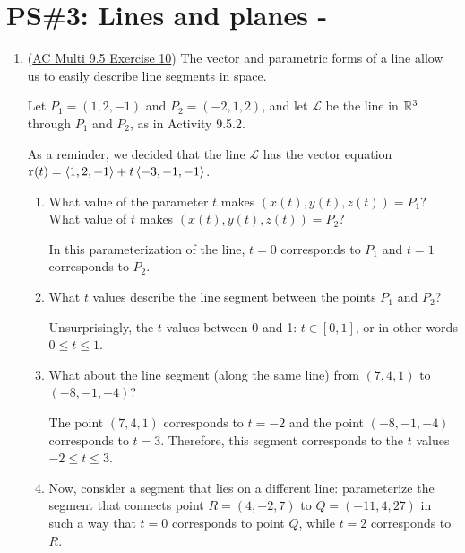 


%


\allowdisplaybreaks
\section{PS\#3: Lines and planes -  }

\begin{enumerate}[leftmargin=0pt]

\item (\href{https://activecalculus.org/multi/S-9-5-Lines-Planes.html#Ez_9_5_1}{AC Multi 9.5 Exercise 10})  The vector and parametric forms of a line allow us to easily describe line segments in space.

Let $P_1 = (1, 2, -1)$ and $P_2 = (-2, 1, 2)$, and let $\mathcal{L}$ be the line in $\mathbb{R}^3$ through $P_1$ and $P_2$, as in Activity 9.5.2. 
\begin{red}
	As a reminder, we decided that the line $\mathcal{L}$ has the vector equation $\mathbf{r}(t) = \langle 1, 2, -1 \rangle + t\,\langle -3, -1, -1 \rangle$.
\end{red}
\begin{enumerate}
	\item What value of the parameter $t$ makes $(x(t), y(t), z(t)) = P_1$? What value of $t$ makes $(x(t), y(t), z(t)) = P_2$? 
	
	\begin{red}
		In this parameterization of the line, $t=0$ corresponds to $P_1$ and $t=1$ corresponds to $P_2$.
	\end{red}
	\item What $t$ values describe the line segment between the points $P_1$ and $P_2$?
	
	\begin{red}
		Unsurprisingly, the $t$ values between 0 and 1: $t\in[0, 1]$, or in other words $0 \leq t \leq 1$.
	\end{red}
	\item What about the line segment (along the same line) from $(7,4,1)$ to $(-8, -1, -4)$?
	
	\begin{red}
		The point $(7,4,1)$ corresponds to $t = -2$ and the point $(-8, -1, -4)$ corresponds to $t = 3$. Therefore, this segment corresponds to the $t$ values $-2 \leq t \leq 3$.
	\end{red}
	\item Now, consider a segment that lies on a different line: parameterize the segment that connects point $R=(4, -2, 7)$ to $Q = (-11, 4, 27)$ in such a way that $t=0$ corresponds to point $Q$, while $t=2$ corresponds to $R$.
	

\end{enumerate}
\end{enumerate}
